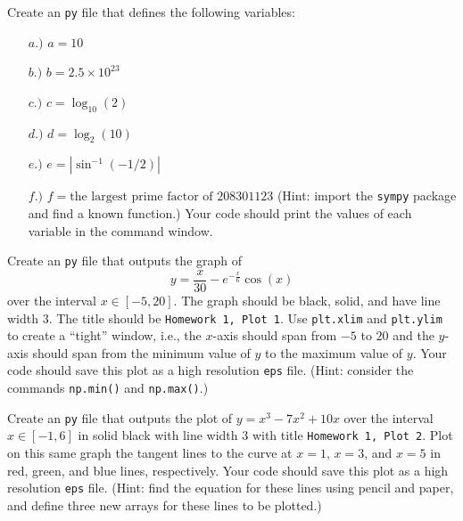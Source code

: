 \documentclass[10pt]{article}
\begin{document}
\begin{enumerate}[{$\qquad 1.]$}]

\item Create an \texttt{py} file that defines the following variables:
\begin{multicols}{2}
\begin{enumerate}
\item[$a.)$] $a = 10$
\item[$b.)$] $b = 2.5\times 10^{23}$
\item[$c.)$] $c = \log_{10}(2)$
\item[$d.)$] $d = \log_{2}(10)$
\item[$e.)$] $e = |\sin^{-1}(-1/2)|$
\item[$f.)$] $f = \text{the largest prime factor of 208301123}$ (Hint: import the \texttt{sympy} package and find a known function.)
Your code should print the values of each variable in the command window. 

\end{enumerate}  
\end{multicols}

\item Create an \texttt{py} file that outputs the graph of 
\[ y = \frac{x}{30} - e^{-\frac{x}{6}}\cos(x)\] 
over the interval $x\in[-5,20]$.  The graph should be black, solid, and have line width 3.  The title should be \texttt{Homework 1, Plot 1}.  Use \texttt{plt.xlim} and \texttt{plt.ylim} to create a ``tight'' window, i.e., the $x$-axis should span from $-5$ to $20$ and the $y$-axis should span from the minimum value of $y$ to the maximum value of $y$.  Your code should save this plot as a high resolution \texttt{eps} file.  (Hint: consider the commands \texttt{np.min()} and \texttt{np.max()}.)


\item Create an \texttt{py} file that outputs the plot of $y = x^3-7x^2+10x$ over the interval $x\in [-1,6]$ in solid black with line width 3 with title \texttt{Homework 1, Plot 2}.  Plot on this same graph the tangent lines to the curve at $x = 1$, $x = 3$, and $x = 5$ in red, green, and blue lines, respectively.  Your code should save this plot as a high resolution \texttt{eps} file. (Hint: find the equation for these lines using pencil and paper, and define three new arrays for these lines to be plotted.)





\end{enumerate}
\end{document}
